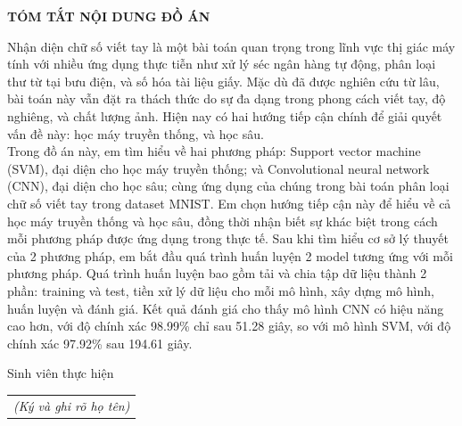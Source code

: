 \documentclass[../DoAn.tex]{subfiles}
\begin{document}
\begin{center}
    \Large{\textbf{TÓM TẮT NỘI DUNG ĐỒ ÁN}}\\
\end{center}
\vspace{1cm}
Nhận diện chữ số viết tay là một bài toán quan trọng trong lĩnh vực thị giác máy tính với nhiều ứng dụng thực tiễn như xử lý séc ngân hàng tự động, phân loại thư từ tại bưu điện, và số hóa tài liệu giấy. Mặc dù đã được nghiên cứu từ lâu, bài toán này vẫn đặt ra thách thức do sự đa dạng trong phong cách viết tay, độ nghiêng, và chất lượng ảnh. Hiện nay có hai hướng tiếp cận chính để giải quyết vấn đề này: học máy truyền thống, và học sâu. \\
\indent Trong đồ án này, em tìm hiểu về hai phương pháp: Support vector machine (SVM), đại diện cho học máy truyền thống; và Convolutional neural network (CNN), đại diện cho học sâu; cùng ứng dụng của chúng trong bài toán phân loại chữ số viết tay trong dataset MNIST. Em chọn hướng tiếp cận này để hiểu về cả học máy truyền thống và học sâu, đồng thời nhận biết sự khác biệt trong cách mỗi phương pháp được ứng dụng trong thực tế. Sau khi tìm hiểu cơ sở lý thuyết của 2 phương pháp, em bắt đầu quá trình huấn luyện 2 model tương ứng với mỗi phương pháp. Quá trình huấn luyện bao gồm tải và chia tập dữ liệu thành 2 phần: training và test, tiền xử lý dữ liệu cho mỗi mô hình, xây dựng mô hình, huấn luyện và đánh giá. Kết quả đánh giá cho thấy mô hình CNN có hiệu năng cao hơn, với độ chính xác 98.99\% chỉ sau 51.28 giây, so với mô hình SVM, với độ chính xác 97.92\% sau 194.61 giây. 


\begin{flushright}
Sinh viên thực hiện\\
\begin{tabular}{@{}c@{}}
\textit{(Ký và ghi rõ họ tên)}
\end{tabular}
\end{flushright}
\end{document}
